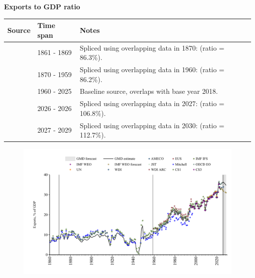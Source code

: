 \documentclass[12pt,a4paper,landscape]{article}
\begin{document}
\begin{adjustbox}{max totalsize={\paperwidth}{\paperheight},center}
\begin{minipage}[t][\textheight][t]{\textwidth}
\vspace*{0.5cm}
{}
\begin{center}
{\Large\bfseries Exports to GDP ratio}
\end{center}
\vspace{0.5cm}
\begin{table}[H]
\centering
\small
\begin{tabular}{|l|l|l|}
\hline
\textbf{Source} & \textbf{Time span} & \textbf{Notes} \\
\hline
\rowcolor{white}\cite{CS1_ITA}& 1861 - 1869 &Spliced using overlapping data in 1870: (ratio = 86.3\%). \\
\rowcolor{lightgray}\cite{JST}& 1870 - 1959 &Spliced using overlapping data in 1960: (ratio = 86.2\%). \\
\rowcolor{white}\cite{OECD_EO}& 1960 - 2025 &Baseline source, overlaps with base year 2018. \\
\rowcolor{lightgray}\cite{AMECO}& 2026 - 2026 &Spliced using overlapping data in 2027: (ratio = 106.8\%). \\
\rowcolor{white}\cite{IMF_WEO_forecast}& 2027 - 2029 &Spliced using overlapping data in 2030: (ratio = 112.7\%). \\
\hline
\end{tabular}
\end{table}
\begin{figure}[H]
\centering
\includegraphics[width=\textwidth,height=0.6\textheight,keepaspectratio]{graphs/ITA_exports_GDP.pdf}
\end{figure}
\end{minipage}
\end{adjustbox}
\end{document}
